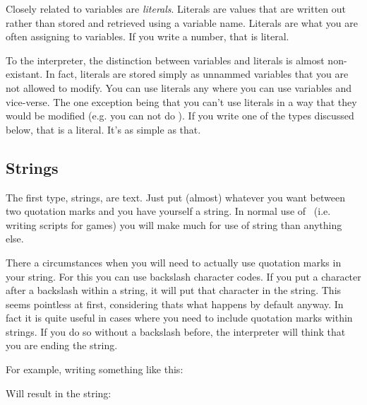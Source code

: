 \documentclass{book}
\begin{document}
Closely related to variables are \emph{literals}.  Literals are values that are written out rather than stored and retrieved using a variable name.  Literals are what you are often assigning to variables.  If you write a number, that is literal.  

To the interpreter, the distinction between variables and literals is almost non-existant.  In fact, literals are stored simply as unnammed variables that you are not allowed to modify.  You can use literals any where you can use variables and vice-verse.  The one exception being that you can't use literals in a way that they would be modified (e.g. you can not do ).  If you write one of the types discussed below, that is a literal.  It's as simple as that.

\subsection{Strings}

The first type, strings, are text.  Just put (almost) whatever you want between two quotation marks and you have yourself a string.   In normal use of \SSquared\ (i.e. writing scripts for games) you will make much for use of string than anything else.

\begin{SSCodeBox}
\end{SSCodeBox}

There a circumstances when you will need to actually use quotation marks in your string.  For this you can use backslash character codes.  If you put a character after a backslash within a string, it will put that character in the string.  This seems pointless at first, considering thats what happens by default anyway.  In fact it is quite useful in cases where you need to include quotation marks within strings.  If you do so without a backslash before, the interpreter will think that you are ending the string.

For example, writing something like this:

\begin{SSCodeBox}
\end{SSCodeBox}

Will result in the string:

\begin{SSCodeBox}
\end{SSCodeBox}
\end{document}
